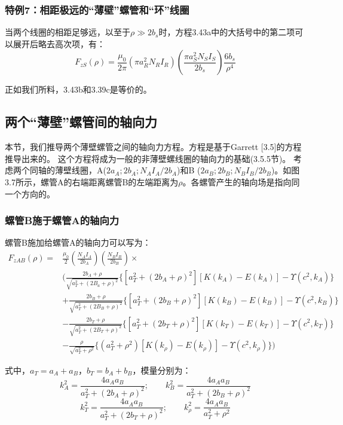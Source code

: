 \subsubsection{特例7：相距极远的“薄壁”螺管和“环”线圈}
当两个线圈的相距足够远，以至于$\rho \gg 2b_s$时，方程3.43a中的大括号中的第二项可以展开后略去高次项，有：
\begin{equation*}
F_{zS}(\rho)=\frac{\mu_0}{2\pi}(\pi a_R^2 N_R I_R)(\frac{\pi a_S^2 N_S I_S}{2 b_s})\frac{6b_s}{\rho^4} \tag{3.43'}
\end{equation*}

正如我们所料，3.43b和3.39c是等价的。

\subsection{两个“薄壁”螺管间的轴向力}
本节，我们推导两个薄壁螺管之间的轴向力方程。方程是基于Garrett [3.5]的方程推导出来的。
这个方程将成为一般的非薄壁螺线圈的轴向力的基础(3.5.5节)。
考虑两个同轴的薄壁线圈，A($2a_A; 2b_A; N_A I_A/2b_A$)和B ($2a_B; 2b_B;
N_B I_B/2b_B$)。如图3.7所示，螺管A的右端距离螺管B的左端距离为$\rho$。各螺管产生的轴向场是指向同一个方向的。

\subsubsection{螺管B施于螺管A的轴向力}
螺管B施加给螺管A的轴向力可以写为：
\begin{equation}
\begin{split}
F_{zAB}(\rho)=&\frac{\mu_0}{2}(\frac{N_A I_A}{2b_A})(\frac{N_B I_B}{2b_B})\times \\
&\bigg(\frac{2b_A+\rho}{\sqrt{a_T^2+(2B_a+\rho)^2}} \{[a_T^2+(2b_A+\rho)^2][K(k_{A})-E(k_{A})]-\Upsilon(c^2,k_A)\}\\
&+\frac{2b_B+\rho}{\sqrt{a_T^2+(2B_B+\rho)^2}} \{[a_T^2+(2b_B+\rho)^2][K(k_{B})-E(k_{B})]-\Upsilon(c^2,k_B) \}\\
&-\frac{2b_T+\rho}{\sqrt{a_T^2+(2B_T+\rho)^2}} \{[a_T^2+(2b_T+\rho)^2][K(k_{T})-E(k_{T})]-\Upsilon(c^2,k_T) \}\\
&-\frac{\rho}{\sqrt{a_T^2+\rho^2}}\{(a_T^2+\rho^2)[K(k_\rho)-E(k_\rho)]-\Upsilon(c^2,k_\rho)\}\bigg)
\end{split}
\end{equation}

式中，$a_T=a_A+a_B$，$b_T=b_A+b_B$，模量分别为：
$$k_{A}^2=\frac{4a_A a_B}{a_T^2+(2b_A+\rho)^2} ;\qquad k_{B}^2=\frac{4a_A a_B}{a_T^2+(2b_B+\rho)^2} $$
$$k_{T}^2=\frac{4a_A a_B}{a_T^2+(2b_T+\rho)^2} ;\qquad k_{\rho}^2=\frac{4a_A a_B}{a_T^2+\rho^2} $$

